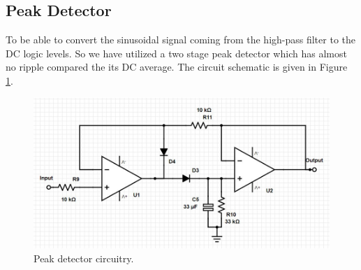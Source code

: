 \documentclass[a4paper,10pt]{IEEEtran}
\begin{document}
\subsection{Peak Detector}
To be able to convert the sinusoidal signal coming from the high-pass filter to the DC logic levels. So we have utilized a two stage peak detector which has almost no ripple compared the its DC average. The circuit schematic is given in Figure \ref{peak}.
\begin{figure}[htbp!]
    \centering
    \includegraphics[width = 1\linewidth]{Peak Detector.jpg}
    \caption{Peak detector circuitry.}
    \label{peak}
\end{figure} 
\end{document}

